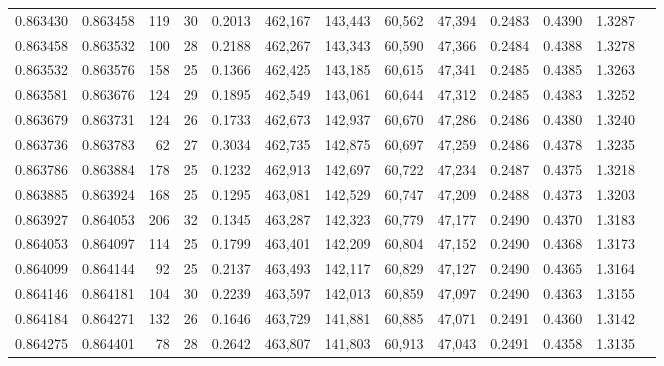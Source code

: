 \begin{tabular}{rrrrrrrrrrrrr}
0.863430 & 0.863458 &   119 &  30 &                                     0.2013 & 462,167 & 143,443 &  60,562 &  47,394 & 0.2483 & 0.4390 & 1.3287 \\
0.863458 & 0.863532 &   100 &  28 &                                     0.2188 & 462,267 & 143,343 &  60,590 &  47,366 & 0.2484 & 0.4388 & 1.3278 \\
0.863532 & 0.863576 &   158 &  25 &                                     0.1366 & 462,425 & 143,185 &  60,615 &  47,341 & 0.2485 & 0.4385 & 1.3263 \\
0.863581 & 0.863676 &   124 &  29 &                                     0.1895 & 462,549 & 143,061 &  60,644 &  47,312 & 0.2485 & 0.4383 & 1.3252 \\
0.863679 & 0.863731 &   124 &  26 &                                     0.1733 & 462,673 & 142,937 &  60,670 &  47,286 & 0.2486 & 0.4380 & 1.3240 \\
0.863736 & 0.863783 &    62 &  27 &                                     0.3034 & 462,735 & 142,875 &  60,697 &  47,259 & 0.2486 & 0.4378 & 1.3235 \\
0.863786 & 0.863884 &   178 &  25 &                                     0.1232 & 462,913 & 142,697 &  60,722 &  47,234 & 0.2487 & 0.4375 & 1.3218 \\
0.863885 & 0.863924 &   168 &  25 &                                     0.1295 & 463,081 & 142,529 &  60,747 &  47,209 & 0.2488 & 0.4373 & 1.3203 \\
0.863927 & 0.864053 &   206 &  32 &                                     0.1345 & 463,287 & 142,323 &  60,779 &  47,177 & 0.2490 & 0.4370 & 1.3183 \\
0.864053 & 0.864097 &   114 &  25 &                                     0.1799 & 463,401 & 142,209 &  60,804 &  47,152 & 0.2490 & 0.4368 & 1.3173 \\
0.864099 & 0.864144 &    92 &  25 &                                     0.2137 & 463,493 & 142,117 &  60,829 &  47,127 & 0.2490 & 0.4365 & 1.3164 \\
0.864146 & 0.864181 &   104 &  30 &                                     0.2239 & 463,597 & 142,013 &  60,859 &  47,097 & 0.2490 & 0.4363 & 1.3155 \\
0.864184 & 0.864271 &   132 &  26 &                                     0.1646 & 463,729 & 141,881 &  60,885 &  47,071 & 0.2491 & 0.4360 & 1.3142 \\
0.864275 & 0.864401 &    78 &  28 &                                     0.2642 & 463,807 & 141,803 &  60,913 &  47,043 & 0.2491 & 0.4358 & 1.3135 \\

\end{tabular}
